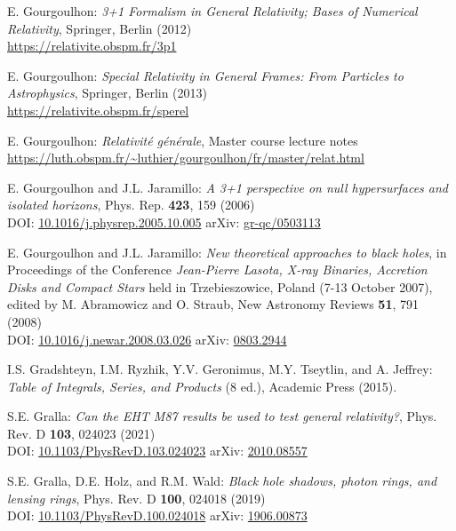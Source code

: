 \begin{thebibliography}{123}
E. Gourgoulhon:
{\em 3+1 Formalism in General Relativity; Bases of Numerical Relativity},
Springer, Berlin (2012)\\
\url{https://relativite.obspm.fr/3p1}

E. Gourgoulhon:
{\em Special Relativity in General Frames: From Particles to Astrophysics},
Springer, Berlin (2013) \\
\url{https://relativite.obspm.fr/sperel}

E. Gourgoulhon:
{\em Relativité générale},
Master course lecture notes\\
\url{https://luth.obspm.fr/~luthier/gourgoulhon/fr/master/relat.html}

E. Gourgoulhon and J.L. Jaramillo:
{\em A 3+1 perspective on null hypersurfaces and isolated horizons},
Phys. Rep. {\bf 423}, 159 (2006)\\
DOI: \href{https://doi.org/10.1016/j.physrep.2005.10.005}{10.1016/j.physrep.2005.10.005}\hfill
arXiv: \href{https://arxiv.org/abs/gr-qc/0503113}{gr-qc/0503113}

E. Gourgoulhon and J.L. Jaramillo:
{\em New theoretical approaches to black holes},
in Proceedings of the Conference {\em Jean-Pierre Lasota, X-ray Binaries, Accretion Disks and Compact Stars} held in Trzebieszowice, Poland (7-13 October 2007), edited by M. Abramowicz and O. Straub, New Astronomy Reviews {\bf 51}, 791 (2008) \\
DOI: \href{https://doi.org/10.1016/j.newar.2008.03.026}{10.1016/j.newar.2008.03.026}\hfill
arXiv: \href{https://arxiv.org/abs/0803.2944}{0803.2944}

I.S. Gradshteyn, I.M. Ryzhik, Y.V. Geronimus, M.Y. Tseytlin, and A. Jeffrey:
{\em  Table of Integrals, Series, and Products} (8 ed.),
Academic Press (2015).

S.E. Gralla:
{\em Can the EHT M87 results be used to test general relativity?},
Phys. Rev. D {\bf 103}, 024023 (2021)\\
DOI: \href{https://doi.org/10.1103/PhysRevD.103.024023}{10.1103/PhysRevD.103.024023}\hfill
arXiv: \href{https://arxiv.org/abs/2010.08557}{2010.08557}

S.E. Gralla, D.E. Holz, and R.M. Wald:
{\em Black hole shadows, photon rings, and lensing rings},
Phys. Rev. D {\bf 100}, 024018 (2019)\\
DOI: \href{https://doi.org/10.1103/PhysRevD.100.024018}{10.1103/PhysRevD.100.024018}\hfill
arXiv: \href{https://arxiv.org/abs/1906.00873}{1906.00873}


\end{thebibliography}
